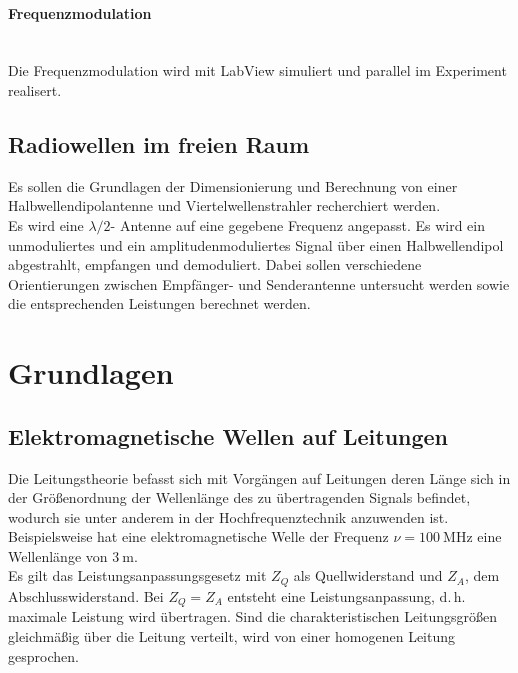\documentclass[a4paper,twoside,final]{article}
\begin{document}
\paragraph{Frequenzmodulation}$~$\\
Die Frequenzmodulation wird mit LabView simuliert und parallel im Experiment realisert.

\subsection{Radiowellen im freien Raum}
Es sollen die Grundlagen der Dimensionierung und Berechnung von einer Halbwellendipolantenne und Viertelwellenstrahler recherchiert werden.\\
Es wird eine $\lambda / 2$- Antenne auf eine gegebene Frequenz angepasst. Es wird ein unmoduliertes und ein amplitudenmoduliertes Signal über einen Halbwellendipol abgestrahlt, empfangen und demoduliert. Dabei sollen verschiedene Orientierungen zwischen Empfänger- und Senderantenne untersucht werden sowie die entsprechenden Leistungen berechnet werden. \\


\newpage
\section{Grundlagen} \label{sec:Grundlagen}

\subsection{Elektromagnetische Wellen auf Leitungen}
Die Leitungstheorie befasst sich mit Vorgängen auf Leitungen deren Länge sich in der Größenordnung der Wellenlänge
des zu übertragenden Signals befindet, wodurch sie unter anderem in der Hochfrequenztechnik anzuwenden ist. Beispielsweise hat eine elektromagnetische Welle der Frequenz $\nu = \SI{100}{\mega\hertz}$ eine Wellenlänge von $\SI{3}{\metre}$. \\
Es gilt das Leistungsanpassungsgesetz mit $Z_Q$ als Quellwiderstand und $Z_A$, dem Abschlusswiderstand. Bei $Z_Q = Z_A$ entsteht eine Leistungsanpassung, d.\,h. maximale Leistung wird übertragen. Sind die charakteristischen Leitungsgrößen gleichmäßig über die Leitung verteilt, wird von einer homogenen Leitung gesprochen.
\end{document}
